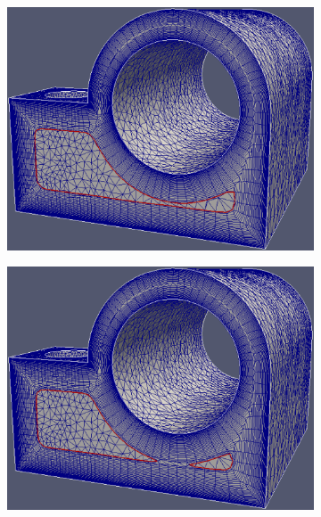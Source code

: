 \documentclass[conf]{new-aiaa}
\begin{document}

\begin{figure}
\centering
\begin{subfigure}{.5\textwidth}
  \centering
  \includegraphics[width=.9\linewidth]{meshCases/joint-x0.004-g1.04-a5/collapse1.eps}
  \caption{}
  \label{fig-collision1}
\end{subfigure}%
\begin{subfigure}{.5\textwidth}
  \centering
  \includegraphics[width=.9\linewidth]{meshCases/joint-x0.004-g1.04-a5/collapse2.eps}

\end{subfigure}
\end{figure}
\end{document}
